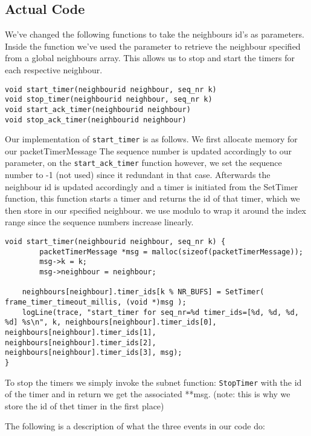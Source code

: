 \hfill \break
\subsection{Actual Code}




We've changed the following functions to take the neighbours id's as parameters.
Inside the function we've used the parameter to retrieve the neighbour specified from a global neighbours array.
This allows us to stop and start the timers for each respective neighbour.

\begin{lstlisting}
void start_timer(neighbourid neighbour, seq_nr k)
void stop_timer(neighbourid neighbour, seq_nr k)
void start_ack_timer(neighbourid neighbour)
void stop_ack_timer(neighbourid neighbour)
\end{lstlisting}


Our implementation of \texttt{start\_timer} is as follows. We first allocate memory for our {packetTimerMessage}
The sequence number is updated accordingly to our parameter, on the \texttt{start\_ack\_timer} function however, we set the sequence number to -1 (not used) since it redundant in that case.
Afterwards the neighbour id is updated accordingly and a timer is initiated from the SetTimer function, this function starts a timer and returns the id of that timer,
which we then store in our specified neighbour.
we use modulo to wrap it around the index range since the sequence numbers increase linearly.
\begin{lstlisting}
void start_timer(neighbourid neighbour, seq_nr k) {
        packetTimerMessage *msg = malloc(sizeof(packetTimerMessage));
        msg->k = k;
        msg->neighbour = neighbour;

	neighbours[neighbour].timer_ids[k % NR_BUFS] = SetTimer( frame_timer_timeout_millis, (void *)msg );
	logLine(trace, "start_timer for seq_nr=%d timer_ids=[%d, %d, %d, %d] %s\n", k, neighbours[neighbour].timer_ids[0], neighbours[neighbour].timer_ids[1], neighbours[neighbour].timer_ids[2], neighbours[neighbour].timer_ids[3], msg);
}
\end{lstlisting}


To stop the timers we simply invoke the subnet function: \texttt{StopTimer} with the id of the timer
and in return we get the associated **msg. (note: this is why we store the id of thet timer in the first place)


The following is a description of what the three events in our code do:
\\

